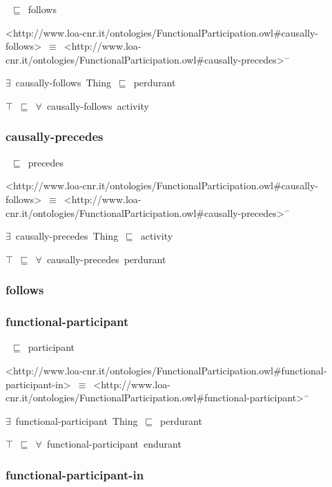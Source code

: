 \documentclass{article}
\begin{document}
~\ensuremath{\sqsubseteq}~follows

<http://www.loa-cnr.it/ontologies/FunctionalParticipation.owl#causally-follows>~\ensuremath{\equiv}~<http://www.loa-cnr.it/ontologies/FunctionalParticipation.owl#causally-precedes>\ensuremath{^-}

\ensuremath{\exists}~causally-follows~Thing~\ensuremath{\sqsubseteq}~perdurant

\ensuremath{\top}~\ensuremath{\sqsubseteq}~\ensuremath{\forall}~causally-follows~activity

\subsubsection*{causally-precedes}

~\ensuremath{\sqsubseteq}~precedes

<http://www.loa-cnr.it/ontologies/FunctionalParticipation.owl#causally-follows>~\ensuremath{\equiv}~<http://www.loa-cnr.it/ontologies/FunctionalParticipation.owl#causally-precedes>\ensuremath{^-}

\ensuremath{\exists}~causally-precedes~Thing~\ensuremath{\sqsubseteq}~activity

\ensuremath{\top}~\ensuremath{\sqsubseteq}~\ensuremath{\forall}~causally-precedes~perdurant

\subsubsection*{follows}

\subsubsection*{functional-participant}

~\ensuremath{\sqsubseteq}~participant

<http://www.loa-cnr.it/ontologies/FunctionalParticipation.owl#functional-participant-in>~\ensuremath{\equiv}~<http://www.loa-cnr.it/ontologies/FunctionalParticipation.owl#functional-participant>\ensuremath{^-}

\ensuremath{\exists}~functional-participant~Thing~\ensuremath{\sqsubseteq}~perdurant

\ensuremath{\top}~\ensuremath{\sqsubseteq}~\ensuremath{\forall}~functional-participant~endurant

\subsubsection*{functional-participant-in}
\end{document}
